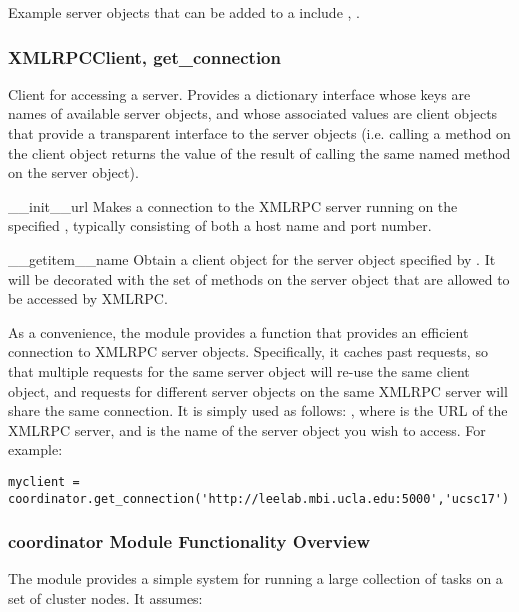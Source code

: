 \documentclass{howto}
\begin{document}
Example server objects that can be added to a 
include , .


\subsubsection{XMLRPCClient, get_connection}
Client for accessing a  server.  Provides 
a dictionary interface whose keys are names of available server objects,
and whose associated values are client objects that provide a transparent
interface to the server objects (i.e. calling a method on the client
object returns the value of the result of calling the same named method
on the server object).
\begin{funcdesc}{__init__}{url}
  Makes a connection to the XMLRPC server running on the specified ,
  typically consisting of both a host name and port number.
\end{funcdesc}
\begin{funcdesc}{__getitem__}{name}
  Obtain a client object for the server object specified by .
  It will be decorated with the set of methods on the server object
  that are allowed to be accessed by XMLRPC.
\end{funcdesc}

As a convenience, the  module provides a function
 that provides an efficient connection to XMLRPC
server objects.  Specifically, it caches past requests, so that multiple
requests for the same server object will re-use the same client object,
and requests for different server objects on the same XMLRPC server will
share the same  connection.  It is simply used as follows:
, where  is the URL of the XMLRPC
server, and  is the name of the server object you wish to access.
For example:
\begin{verbatim}
myclient = coordinator.get_connection('http://leelab.mbi.ucla.edu:5000','ucsc17')
\end{verbatim}

\subsubsection{coordinator Module Functionality Overview}

The  module provides a simple system for running a large collection of tasks on a set of cluster nodes.  It assumes:
\end{document}
